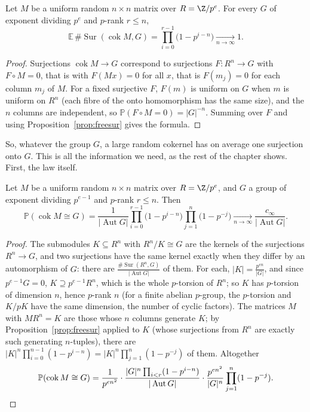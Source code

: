 \begin{theorem}\label{thm:cokmoments}
Let $M$ be a uniform random $n\times n$ matrix over $R=\Z/p^e$. For every $G$ of exponent dividing $p^e$ and $p$-rank $r\le n$,
\[
\mathbb E\,\#\operatorname{Sur}(\operatorname{cok}M,G)=\prod_{i=0}^{r-1}\bigl(1-p^{i-n}\bigr)\xrightarrow[n\to\infty]{}1.
\]
\end{theorem}
\begin{proof}
Surjections $\operatorname{cok}M\to G$ correspond to surjections $F:R^n\to G$ with $F\circ M=0$, that is with $F(Mx)=0$ for all $x$, that is $F(m_j)=0$ for each column $m_j$ of $M$. For a fixed surjective $F$, $F(m)$ is uniform on $G$ when $m$ is uniform on $R^n$ (each fibre of the onto homomorphism has the same size), and the $n$ columns are independent, so $\mathbb P(F\circ M=0)=|G|^{-n}$. Summing over $F$ and using Proposition~\ref{prop:freesur} gives the formula.
\end{proof}

So, whatever the group $G$, a large random cokernel has on average one surjection onto $G$. This is all the information we need, as the rest of the chapter shows. First, the law itself.

\begin{theorem}\label{thm:fw}
Let $M$ be a uniform random $n\times n$ matrix over $R=\Z/p^e$, and $G$ a group of exponent dividing $p^{e-1}$ and $p$-rank $r\le n$. Then
\[
\mathbb P(\operatorname{cok}M\cong G)=\frac1{|\operatorname{Aut}G|}\prod_{i=0}^{r-1}\bigl(1-p^{i-n}\bigr)\prod_{j=1}^n\bigl(1-p^{-j}\bigr)\xrightarrow[n\to\infty]{}\frac{c_\infty}{|\operatorname{Aut}G|}.
\]
\end{theorem}
\begin{proof}
The submodules $K\subseteq R^n$ with $R^n/K\cong G$ are the kernels of the surjections $R^n\to G$, and two surjections have the same kernel exactly when they differ by an automorphism of $G$: there are $\frac{\#\operatorname{Sur}(R^n,G)}{|\operatorname{Aut}G|}$ of them. For each, $|K|=\frac{p^{en}}{|G|}$, and since $p^{e-1}G=0$, $K\supseteq p^{e-1}R^n$, which is the whole $p$-torsion of $R^n$; so $K$ has $p$-torsion of dimension $n$, hence $p$-rank $n$ (for a finite abelian $p$-group, the $p$-torsion and $K/pK$ have the same dimension, the number of cyclic factors). The matrices $M$ with $MR^n=K$ are those whose $n$ columns generate $K$; by Proposition~\ref{prop:freesur} applied to $K$ (whose surjections from $R^n$ are exactly such generating $n$-tuples), there are $|K|^n\prod_{i=0}^{n-1}(1-p^{i-n})=|K|^n\prod_{j=1}^n(1-p^{-j})$ of them. Altogether
\[
\mathbb P(\operatorname{cok}M\cong G)=\frac1{p^{en^2}}\cdot\frac{|G|^n\prod_{i<r}(1-p^{i-n})}{|\operatorname{Aut}G|}\cdot\frac{p^{en^2}}{|G|^n}\prod_{j=1}^n(1-p^{-j}).\qedhere
\]
\end{proof}

